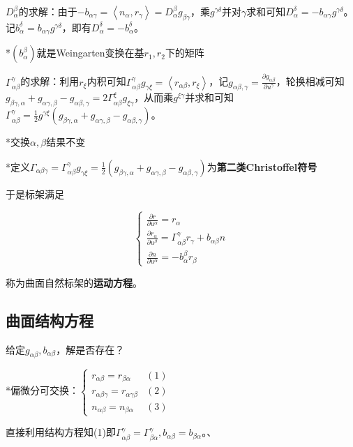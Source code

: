 \documentclass[a4paper,UTF8,fontset=windows]{ctexart}
\begin{document}
$D_\alpha^\beta$的求解：由于$-b_{\alpha\gamma}=\left<n_\alpha,r_\gamma\right>=D_\alpha^\beta g_{\beta\gamma}$，乘$g^{\gamma\delta}$并对$\gamma$求和可知$D_\alpha^\delta=-b_{\alpha\gamma}g^{\gamma\delta}$。记$b_\alpha^\delta=b_{\alpha\gamma}g^{\gamma\delta}$，即有$D_\alpha^\delta=-b_\alpha^\delta$。

*$(b_\alpha^\beta)$就是Weingarten变换在基$r_1,r_2$下的矩阵

$\Gamma_{\alpha\beta}^\gamma$的求解：利用$r_\xi$内积可知$\Gamma_{\alpha\beta}^\gamma g_{\gamma\xi}=\left<r_{\alpha\beta},r_\xi\right>$，记$g_{\alpha\beta,\gamma}=\frac{\partial g_{\alpha\beta}}{\partial u^\gamma}$，轮换相减可知$g_{\beta\gamma,\alpha}+g_{\alpha\gamma,\beta}-g_{\alpha\beta,\gamma}=2\Gamma_{\alpha\beta}^\xi g_{\xi\gamma}$，从而乘$g^{\xi\gamma}$并求和可知$\Gamma_{\alpha\beta}^\gamma=\frac{1}{2}g^{\gamma\xi}(g_{\beta\gamma,\alpha}+g_{\alpha\gamma,\beta}-g_{\alpha\beta,\gamma})$。

*交换$\alpha,\beta$结果不变

*定义$\Gamma_{\alpha\beta\gamma}=\Gamma_{\alpha\beta}^\gamma g_{\gamma\xi}=\frac{1}{2}(g_{\beta\gamma,\alpha}+g_{\alpha\gamma,\beta}-g_{\alpha\beta,\gamma})$为\textbf{第二类Christoffel符号}

于是标架满足

$$\begin{cases}\frac{\partial r}{\partial u^\alpha}=r_\alpha\\\frac{\partial r_\alpha}{\partial u^\beta}=\Gamma_{\alpha\beta}^\gamma r_\gamma+b_{\alpha\beta}n\\\frac{\partial n}{\partial u^\alpha}=-b_\alpha^\beta r_\beta\end{cases}$$

称为曲面自然标架的\textbf{运动方程}。

\subsection{曲面结构方程}

给定$g_{\alpha\beta},b_{\alpha\beta}$，解是否存在？

*偏微分可交换：$\begin{cases}r_{\alpha\beta}=r_{\beta\alpha}&(1)\\r_{\alpha\beta\gamma}=r_{\alpha\gamma\beta}&(2)\\n_{\alpha\beta}=n_{\beta\alpha}&(3)\end{cases}$

直接利用结构方程知(1)即$\Gamma_{\alpha\beta}^\gamma=\Gamma_{\beta\alpha}^\gamma,b_{\alpha\beta}=b_{\beta\alpha}$。、
\end{document}
